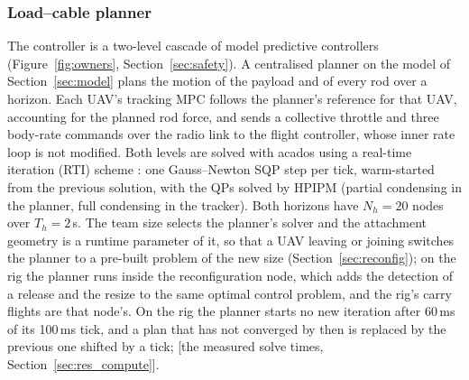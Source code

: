 
\subsubsection{Load--cable planner}
\label{sec:controller}

The controller is a two-level cascade of model predictive controllers (Figure~\ref{fig:owners}, Section~\ref{sec:safety}).
A centralised planner on the model of Section~\ref{sec:model} plans the motion of the payload and of
every rod over a horizon. Each UAV's tracking MPC follows the planner's reference for that UAV,
accounting for the planned rod force, and sends a collective throttle and three body-rate commands
over the radio link to the flight controller, whose inner rate loop is not modified. Both levels are
solved with acados
\cite{verschueren2022acados} using a real-time iteration (RTI) scheme \cite{diehl2002rti}: one
Gauss--Newton SQP step per tick, warm-started from the previous solution, with the QPs solved by
HPIPM \cite{frison2020hpipm} (partial condensing in the planner, full condensing in the tracker).
Both horizons have $N_h = 20$ nodes over $T_h = 2$\,s. The team size selects the planner's solver and the
attachment geometry is a runtime parameter of it, so that a UAV leaving or joining switches the planner to a
pre-built problem of the new size (Section~\ref{sec:reconfig}); on the rig the planner runs inside the
reconfiguration node, which adds the detection of a release and the resize to the same optimal control problem,
and the rig's carry flights are that node's. On the rig the planner starts no new iteration after 60\,ms of its
100\,ms tick, and a plan that has not converged by then is replaced by the previous one shifted by a tick; [the
measured solve times, Section~\ref{sec:res_compute}].

